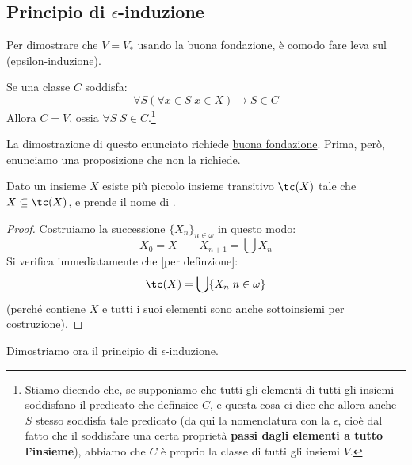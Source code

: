 \documentclass[11pt]{scrartcl}
\begin{document}
\subsection{\texorpdfstring{Principio di $\epsilon$-induzione}{Principio di epsilon-induzione}}

Per dimostrare che $V = V_*$ usando la buona fondazione, è comodo fare leva sul  (epsilon-induzione).

\begin{theorem}
	Se una classe $C$ soddisfa:
	\[ \forall S (\forall x \in S \; x \in X) \rightarrow S \in C
		\]
	Allora $C = V$, ossia $\forall S \; S \in C$.\footnote{Stiamo dicendo che, se  supponiamo che tutti gli elementi di tutti gli
	insiemi soddisfano il predicato che definsice $C$, e questa cosa ci dice che allora anche $S$ stesso soddisfa tale predicato (da qui la
	nomenclatura con la $\epsilon$, cioè dal fatto che il soddisfare una certa proprietà \textbf{passi dagli elementi a tutto l'insieme}), abbiamo che $C$ è proprio la classe di tutti gli insiemi $V$.}
\end{theorem}

La dimostrazione di questo enunciato richiede \hyperref[ax10]{buona fondazione}. Prima, però, enunciamo una proposizione che non la richiede.

\begin{proposition}
	Dato un insieme $X$ esiste più piccolo insieme transitivo $\tc(X)$ tale che $X \subseteq \tc(X)$, e prende il nome di .
\end{proposition}

\begin{proof}
	Costruiamo la successione $\{X_n\}_{n \in \omega}$ in questo modo:
	\[ X_0 = X \qquad X_{n+1} = \bigcup X_n
		\]
	Si verifica immediatamente che [per definzione]:
	\[ \tc(X) = \bigcup\{X_n | n \in \omega\}
		\]
	(perché contiene $X$ e tutti i suoi elementi sono anche sottoinsiemi per costruzione).
\end{proof}

Dimostriamo ora il principio di $\epsilon$-induzione.
\end{document}
